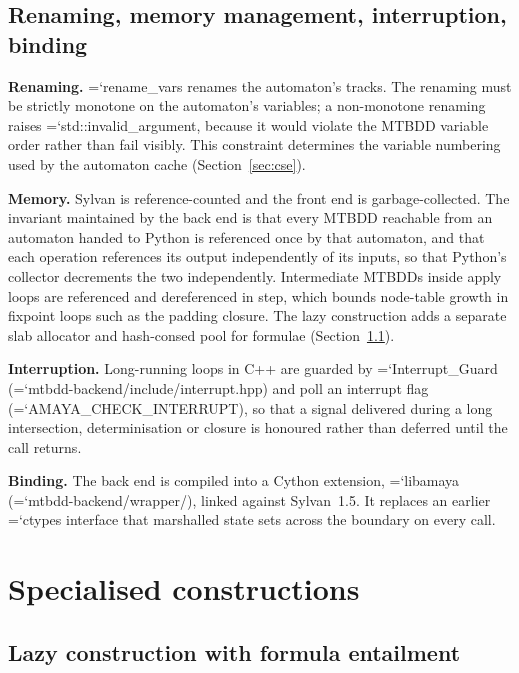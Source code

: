 \documentclass[10pt,a4paper]{article}
\newcommand{\code}[1]{{\small\ttfamily\hyphenchar\font=`\-\relax #1}}
\begin{document}
\subsection{Renaming, memory management, interruption, binding}

\textbf{Renaming.}  \code{rename\_vars} renames the automaton's tracks.  The renaming must be strictly
monotone on the automaton's variables; a non-monotone renaming raises \code{std::invalid\_argument},
because it would violate the MTBDD variable order rather than fail visibly.  This constraint determines
the variable numbering used by the automaton cache (Section~\ref{sec:cse}).

\textbf{Memory.}  Sylvan is reference-counted and the front end is garbage-collected.  The invariant
maintained by the back end is that every MTBDD reachable from an automaton handed to Python is
referenced once by that automaton, and that each operation references its output independently of its
inputs, so that Python's collector decrements the two independently.  Intermediate MTBDDs inside apply
loops are referenced and dereferenced in step, which bounds node-table growth in fixpoint loops such as
the padding closure.  The lazy construction adds a separate slab allocator and hash-consed pool for
formulae (Section~\ref{sec:lazy}).

\textbf{Interruption.}  Long-running loops in C++ are guarded by \code{Interrupt\_Guard}
(\code{mtbdd-backend/include/interrupt.hpp}) and poll an interrupt flag
(\code{AMAYA\_CHECK\_INTERRUPT}), so that a signal delivered during a long intersection, determinisation
or closure is honoured rather than deferred until the call returns.

\textbf{Binding.}  The back end is compiled into a Cython extension, \code{libamaya}
(\code{mtbdd-backend/wrapper/}), linked against Sylvan~1.5.  It replaces an earlier \code{ctypes}
interface that marshalled state sets across the boundary on every call.

\section{Specialised constructions}
\label{sec:constructions}

\subsection{Lazy construction with formula entailment}
\label{sec:lazy}
\end{document}
